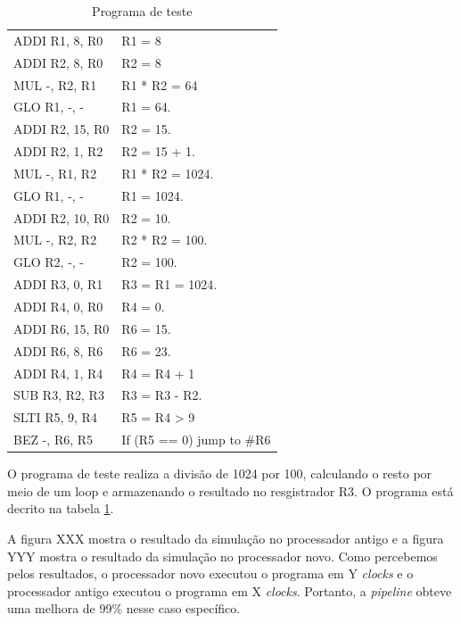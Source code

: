 \documentclass[11pt,a4paper,titlepage]{article}
\begin{document}
\begin{table}[!h]
\centering
\begin{tabular}{| l | l |}
\hline
ADDI R1, 8, R0   &  R1 = 8                             \\
ADDI R2, 8, R0   &  R2 = 8                             \\
MUL  -, R2, R1   &  R1 * R2 = 64                       \\
GLO  R1, -, -    &  R1 = 64.                           \\
ADDI R2, 15, R0  &  R2 = 15.                           \\
ADDI R2, 1, R2   &  R2 = 15 + 1.                       \\
MUL  -, R1, R2   &  R1 * R2 = 1024.                    \\
GLO  R1, -, -    &  R1 = 1024.                         \\
ADDI R2, 10, R0  &  R2 = 10.                           \\
MUL  -, R2, R2   &  R2 * R2 = 100.                     \\
GLO  R2, -, -    &  R2 = 100.                          \\
ADDI R3, 0, R1   &  R3 = R1 = 1024.                    \\
ADDI R4, 0, R0   &  R4 = 0.                            \\
ADDI R6, 15, R0  &  R6 = 15.                           \\
ADDI R6, 8, R6   &  R6 = 23.                           \\
ADDI R4, 1, R4   &  R4 = R4 + 1                        \\
SUB  R3, R2, R3  &  R3 = R3 - R2.                      \\
SLTI R5, 9, R4   &  R5 = R4 > 9                        \\
BEZ   -, R6, R5  &  If (R5 == 0) { jump to \#R6 }        \\
\hline
\end{tabular}
\caption{Programa de teste}
\label{tab:program}
\end{table}

O programa de teste realiza a divisão de 1024 por 100, calculando o resto por meio de um loop e armazenando 
o resultado no resgistrador R3. O programa está decrito na tabela \ref{tab:program}.

A figura XXX mostra o resultado da simulação no processador antigo e a figura YYY mostra o resultado da 
simulação no processador novo. Como percebemos pelos resultados, o processador novo executou o programa
em Y \textit{clocks} e o processador antigo executou o programa em X \textit{clocks}. Portanto, a
\textit{pipeline} obteve uma melhora de 99\% nesse caso específico.
\end{document}
